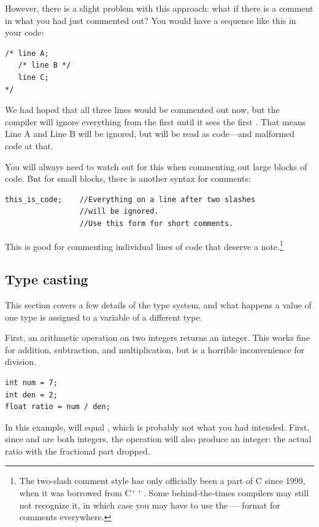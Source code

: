\documentclass[12pt]{article}
\begin{document}
However, there is a slight problem with this approach: what if there is a comment in what you had just
commented out? You would have a sequence like this in your code: 
\begin{lstlisting}
/* line A; 
   /* line B */ 
   line C; 
*/
\end{lstlisting}
We had hoped that all three lines would be commented out now, but the compiler will ignore everything
from the first \cinline{/*} until it sees the first \cinline{*/}. That means Line A and Line B will be ignored,
but  will be read as code---and malformed code at that.

You will always need to watch out for this when commenting out large blocks of code. But for small
blocks, there is another syntax for comments:
\begin{verbatim}
this_is_code;    //Everything on a line after two slashes 
                 //will be ignored.
                 //Use this form for short comments.
\end{verbatim}
This is good for commenting individual lines of code that deserve a
note.\footnote{The two-slash comment style has only officially been
a part of C since 1999, when it was borrowed from C$^{++}$. Some
behind-the-times compilers may still not recognize it, in which case
you may have to use the \cinline{/*} --- \cinline{*/} format for comments
everywhere.}

\subsection{Type casting}\label{casting}   
This section covers a few details of the type system, and what happens
a value of one type is assigned to a variable of a different type.

First, an arithmetic operation on two integers returns an integer. This works fine for
addition, subtraction, and multiplication, but is a horrible inconvenience for division.\\
\begin{lstlisting}
int num = 7;
int den = 2;
float ratio = num / den;
\end{lstlisting}
In this example,  will equal , which is probably not what you had intended. 
First, since  and  are both integers, the operation
 will also produce an integer: the actual ratio with the
fractional part dropped.
\end{document}
